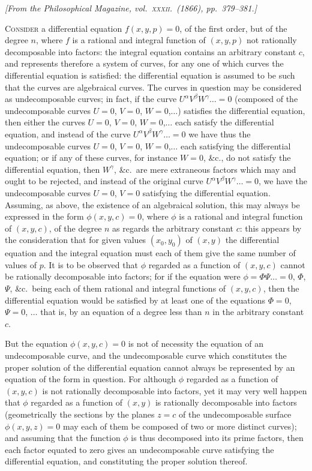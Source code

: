\documentclass[11pt,a4paper]{article}
\begin{document}
\begin{center}
\textit{[From the Philosophical Magazine, vol.~\textsc{xxxii}.\ (1866), pp.~379--381.]}
\end{center}

\textsc{Consider} a differential equation $f(x,y,p)=0$, of the first order, but of
the degree $n$, where $f$ is a rational and integral function of $(x,y,p)$ not
rationally decomposable into factors: the integral equation contains an
arbitrary constant $c$, and represents therefore a system of curves, for any
one of which curves the differential equation is satisfied: the differential
equation is assumed to be such that the curves are algebraical curves.  The
curves in question may be considered as undecomposable curves; in fact, if the
curve $U^\alpha V^\beta W^\gamma \ldots = 0$ (composed of the undecomposable curves
$U=0$, $V=0$, $W=0$,$\ldots$) satisfies the differential equation, then either
the curves $U=0$, $V=0$, $W=0$,$\ldots$ each satisfy the differential equation,
and instead of the curve $U^\alpha V^\beta W^\gamma\ldots = 0$ we have thus the
undecomposable curves $U=0$, $V=0$, $W=0$,$\ldots$ each satisfying the
differential equation; or if any of these curves, for instance $W=0$, \&c., do
not satisfy the differential equation, then $W^\gamma$, \&c.\ are mere extraneous
factors which may and ought to be rejected, and instead of the original curve
$U^\alpha V^\beta W^\gamma\ldots = 0$, we have the undecomposable curves $U=0$,
$V=0$ satisfying the differential equation.  Assuming, as above, the existence
of an algebraical solution, this may always be expressed in the form
$\phi(x, y, c) = 0$, where $\phi$ is a rational and integral function of
$(x, y, c)$, of the degree $n$ as regards the arbitrary constant $c$: this
appears by the consideration that for given values $(x_0, y_0)$ of $(x, y)$
the differential equation and the integral equation must each of them give the
same number of values of $p$.  It is to be observed that $\phi$ regarded as a
function of $(x, y, c)$ cannot be rationally decomposable into factors; for if
the equation were $\phi = \Phi\Psi\ldots = 0$, $\Phi$, $\Psi$, \&c.\ being each of
them rational and integral functions of $(x, y, c)$, then the differential
equation would be satisfied by at least one of the equations $\Phi = 0$,
$\Psi = 0$, $\ldots$ that is, by an equation of a degree less than $n$ in the
arbitrary constant $c$.

But the equation $\phi(x, y, c) = 0$ is not of necessity the equation of an
undecomposable curve, and the undecomposable curve which constitutes the
proper solution of the differential equation cannot always be represented by
an equation of the form in question.  For although $\phi$ regarded as a
function of $(x, y, c)$ is not rationally decomposable into factors, yet it
may very well happen that $\phi$ regarded as a function of $(x, y)$ is
rationally decomposable into factors (geometrically the sections by the planes
$z = c$ of the undecomposable surface $\phi(x, y, z) = 0$ may each of them be
composed of two or more distinct curves); and assuming that the function
$\phi$ is thus decomposed into its prime factors, then each factor equated to
zero gives an undecomposable curve satisfying the differential equation, and
constituting the proper solution thereof.
\end{document}
